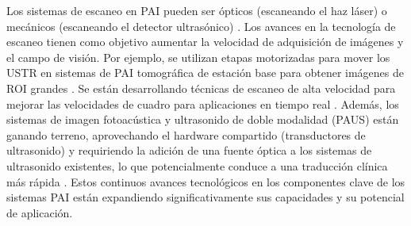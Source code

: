 Los sistemas de escaneo en PAI pueden ser ópticos (escaneando el haz láser) o mecánicos (escaneando el detector ultrasónico) \cite{recent_advances_2025a}. Los avances en la tecnología de escaneo tienen como objetivo aumentar la velocidad de adquisición de imágenes y el campo de visión. Por ejemplo, se utilizan etapas motorizadas para mover los USTR en sistemas de PAI tomográfica de estación base para obtener imágenes de ROI grandes \cite{park_2024}. Se están desarrollando técnicas de escaneo de alta velocidad para mejorar las velocidades de cuadro para aplicaciones en tiempo real \cite{deep_learning_bilab_2024}. Además, los sistemas de imagen fotoacústica y ultrasonido de doble modalidad (PAUS) están ganando terreno, aprovechando el hardware compartido (transductores de ultrasonido) y requiriendo la adición de una fuente óptica a los sistemas de ultrasonido existentes, lo que potencialmente conduce a una traducción clínica más rápida \cite{dual_modal_2024}. Estos continuos avances tecnológicos en los componentes clave de los sistemas PAI están expandiendo significativamente sus capacidades y su potencial de aplicación.


